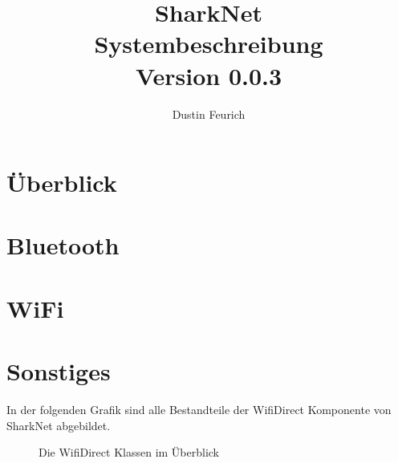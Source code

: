 \documentclass[german, 12pt]{book}
\begin{document}
	
\onehalfspacing

\title{SharkNet\\
Systembeschreibung \\
Version 0.0.3
}

\author{
Dustin Feurich
}

\maketitle

\tableofcontents

\chapter{Überblick}


\chapter{Bluetooth}


\chapter{WiFi}


\chapter{Sonstiges}
In der folgenden Grafik sind alle Bestandteile der WifiDirect Komponente von SharkNet abgebildet.
\begin{figure}[H]
	\centering
	\hspace*{1cm}
	\caption{Die WifiDirect Klassen im Überblick}
	\label{fig:wifiAll}
\end{figure}
\end{document}
